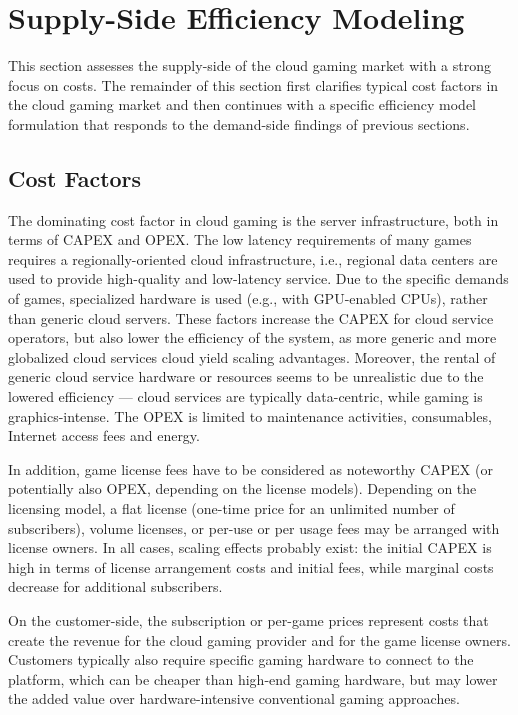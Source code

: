 \section{Supply-Side Efficiency Modeling}
\label{sec:suppliermodelling}

This section assesses the supply-side of the cloud gaming market with a strong focus on costs. The remainder of this section first clarifies typical cost factors in the cloud gaming market and then continues with a specific efficiency model formulation that responds to the demand-side findings of previous sections.

\subsection{Cost Factors}

The dominating cost factor in cloud gaming is the server infrastructure, both in terms of \gls{CAPEX} and \gls{OPEX}. The low latency requirements of many games requires a regionally-oriented cloud infrastructure, i.e., regional data centers are used to provide high-quality and low-latency service. Due to the specific demands of games, specialized hardware is used (e.g., with GPU-enabled CPUs), rather than generic cloud servers. These factors increase the \gls{CAPEX} for cloud service operators, but also lower the efficiency of the system, as more generic and more globalized cloud services cloud yield scaling advantages. Moreover, the rental of generic cloud service hardware or resources seems to be unrealistic due to the lowered efficiency --- cloud services are typically data-centric, while gaming is graphics-intense. The \gls{OPEX} is limited to maintenance activities, consumables, Internet access fees and energy.

In addition, game license fees have to be considered as noteworthy \gls{CAPEX} (or potentially also \gls{OPEX}, depending on the license models). Depending on the licensing model, a flat license (one-time price for an unlimited number of subscribers), volume licenses, or per-use or per usage fees may be arranged with license owners. In all cases, scaling effects probably exist: the initial \gls{CAPEX} is high in terms of license arrangement costs and initial fees, while marginal costs decrease for additional subscribers.

On the customer-side, the subscription or per-game prices represent costs that create the revenue for the cloud gaming provider and for the game license owners. Customers typically also require specific gaming hardware to connect to the platform, which can be cheaper than high-end gaming hardware, but may lower the added value over hardware-intensive conventional gaming approaches.


